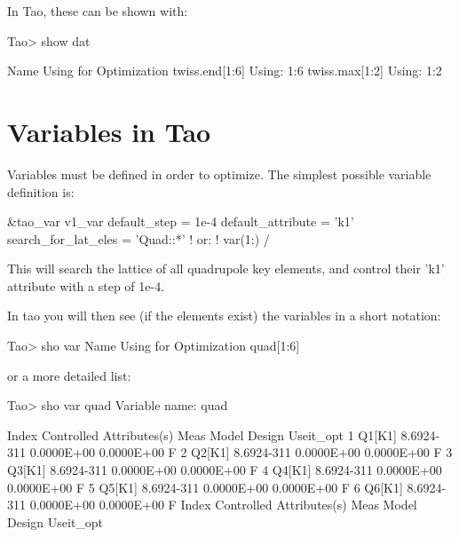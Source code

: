 \documentclass{hitec}
\newcommand{\Section}[1]{\section{#1}\vspace*{-1ex}}
\begin{document}
In Tao, these can be shown with:

    Tao> show dat
    
      Name                                 Using for Optimization
      twiss.end[1:6]                                 Using: 1:6
      twiss.max[1:2]                                 Using: 1:2




\subsection{}


\subsection{}



\Section{Variables in Tao}



Variables must be defined in order to optimize. The simplest possible variable definition is: 

    &tao_var
      v1_var%
      default_step = 1e-4
      default_attribute = 'k1'
      search_for_lat_eles = 'Quad::*'
      ! or: 
      ! var(1:)%
    /

This will search the lattice of all quadrupole key elements, and control their 'k1' attribute with a step of 1e-4.

In tao you will then see (if the elements exist) the variables in a short notation:

    Tao> sho var
           Name                                      Using for Optimization
        quad[1:6]

or a more detailed list:

    Tao> sho var quad
    Variable name:  quad
    
     Index  Controlled Attributes(s)    Meas         Model        Design  Useit_opt
         1  Q1[K1]                  8.6924-311    0.0000E+00    0.0000E+00       F
         2  Q2[K1]                  8.6924-311    0.0000E+00    0.0000E+00       F
         3  Q3[K1]                  8.6924-311    0.0000E+00    0.0000E+00       F
         4  Q4[K1]                  8.6924-311    0.0000E+00    0.0000E+00       F
         5  Q5[K1]                  8.6924-311    0.0000E+00    0.0000E+00       F
         6  Q6[K1]                  8.6924-311    0.0000E+00    0.0000E+00       F
     Index  Controlled Attributes(s)    Meas         Model        Design  Useit_opt
\end{document}
